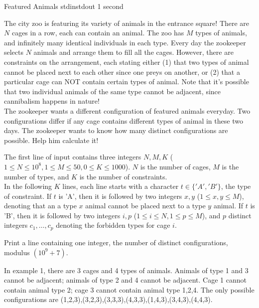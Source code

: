 \begin{problem}{Featured Animals}
{stdin}{stdout}
{1 second}{}{}

The city zoo is featuring its variety of animals in the entrance square! There are $N$ cages in a row, each can contain an animal. The zoo has $M$ types of animals, and infinitely many identical individuals in each type. Every day the zookeeper selects $N$ animals and arrange them to fill all the cages. However, there are constraints on the arrangement, each stating either (1) that two types of animal cannot be placed next to each other since one preys on another, or (2) that a particular cage can NOT contain certain types of animal. Note that it's possible that two individual animals of the same type cannot be adjacent, since cannibalism happens in nature! \\

The zookeeper wants a different configuration of featured animals everyday. Two configurations differ if any cage contains different types of animal in these two days. The zookeeper wants to know how many distinct configurations are possible. Help him calculate it! 

\InputFile

The first line of input contains three integers $N, M, K$ ($1 \le N \le 10^8, 1 \le M \le 50, 0 \le K \le 1000$). $N$ is the number of cages, $M$ is the number of types, and $K$ is the number of constraints. \\
In the following $K$ lines, each line starts with a character $t \in \{'A','B'\}$, the type of constraint. If $t$ is 'A', then it is followed by two integers $x, y$ ($1 \le x, y \le M$), denoting that an a type $x$ animal cannot be placed next to a type $y$ animal. If $t$ is 'B', then it is followed by two integers $i, p$ ($1 \le i \le N, 1 \le p \le M$), and $p$ distinct integers $c_1, \hdots, c_p$ denoting the forbidden types for cage $i$. 

\OutputFile

Print a line containing one integer, the number of distinct configurations, modulus $(10^9+7)$. 

\Examples

\begin{example}
%
%
\end{example}

\Notes

In example 1, there are 3 cages and 4 types of animals. Animals of type 1 and 3 cannot be adjacent; animals of type 2 and 4 cannot be adjacent. Cage 1 cannot contain animal type 2; cage 3 cannot contain animal type 1,2,4. The only possible configurations are (1,2,3),(3,2,3),(3,3,3),(4,3,3),(1,4,3),(3,4,3),(4,4,3). 

\end{problem}
